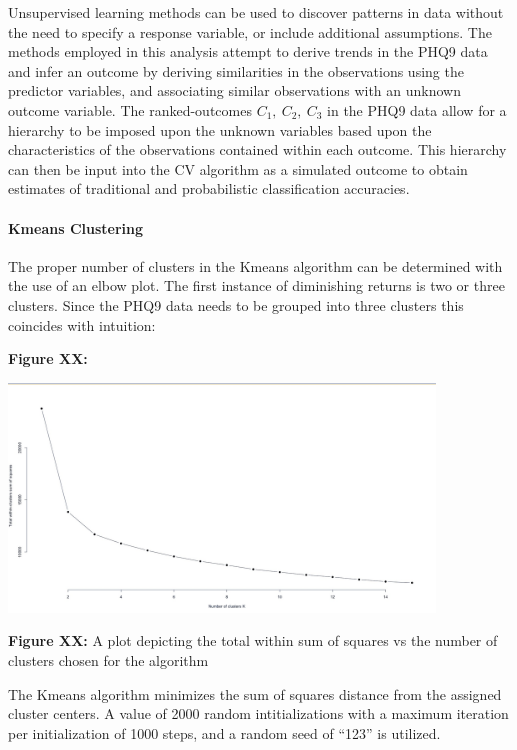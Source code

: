 \documentclass[12pt,]{article}
\let\oldparagraph\paragraph
\renewcommand{\paragraph}[1]{\oldparagraph{#1}\mbox{}}
\begin{document}
Unsupervised learning methods can be used to discover patterns in data
without the need to specify a response variable, or include additional
assumptions. The methods employed in this analysis attempt to derive
trends in the PHQ9 data and infer an outcome by deriving similarities in
the observations using the predictor variables, and associating similar
observations with an unknown outcome variable. The ranked-outcomes
\(C_{1}, \ C_{2}, \ C_{3}\) in the PHQ9 data allow for a hierarchy to be
imposed upon the unknown variables based upon the characteristics of the
observations contained within each outcome. This hierarchy can then be
input into the CV algorithm as a simulated outcome to obtain estimates
of traditional and probabilistic classification accuracies.

\hypertarget{kmeans-clustering}{%
\paragraph{Kmeans Clustering}\label{kmeans-clustering}}

The proper number of clusters in the Kmeans algorithm can be determined
with the use of an elbow plot. The first instance of diminishing returns
is two or three clusters. Since the PHQ9 data needs to be grouped into
three clusters this coincides with intuition:

\textbf{Figure XX:}

\begin{center}
\includegraphics[width=0.85\textwidth]{ElbowPlot.jpeg}
\end{center}

\textbf{Figure XX:} A plot depicting the total within sum of squares vs
the number of clusters chosen for the algorithm

The Kmeans algorithm minimizes the sum of squares distance from the
assigned cluster centers. A value of 2000 random intitializations with a
maximum iteration per initialization of 1000 steps, and a random seed of
``123'' is utilized.
\end{document}
